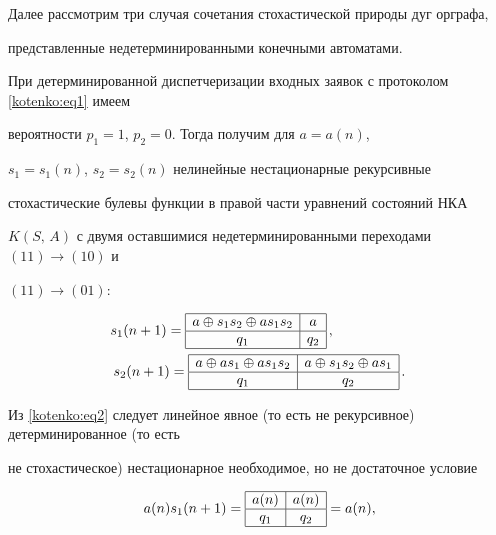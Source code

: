Далее рассмотрим три случая сочетания стохастической природы дуг орграфа,

представленные недетерминированными конечными автоматами.



При детерминированной диспетчеризации входных заявок с протоколом \eqref{kotenko:eq1} имеем

вероятности $p_1=1$, $p_2=0$. Тогда получим для $a=a(n)$,

$s_1=s_1(n)$, $s_2=s_2(n)$ нелинейные нестационарные рекурсивные

стохастические булевы функции в правой части уравнений состояний НКА

$K(S,\,A)$ с двумя оставшимися недетерминированными переходами $(11) \to (10)$ и

$(11)\to (01)$:

\begin{gather}

\label{kotenko:eq2}

s_1 ( n+1) = \begin{array}{|c| c|}

\hline

a\oplus s_1 s_2 \oplus as_1 s_2  & a  \\ \hline

q_1  & q_2  \\ \hline

\end{array}\,, \hspace{1.9cm} \\

\label{kotenko:eq3}

s_2(n+1)= \begin{array}{|c|c|} \hline

a\oplus as_1 \oplus as_1 s_2  & a\oplus s_1 s_2 \oplus as_1 \\ \hline

q_1  & q_2 \\ \hline

\end{array}\,.

\end{gather}



Из \eqref{kotenko:eq2} следует линейное явное (то есть не рекурсивное) детерминированное (то есть

не стохастическое) нестационарное необходимое, но не достаточное условие

\[

a ( n ) s_1 (n+1)=\begin{array}{|c|c|} \hline

a (n)  & a (n) \\ \hline

q_1    & q_2  \\ \hline

\end{array} = a ( n ),

\]

